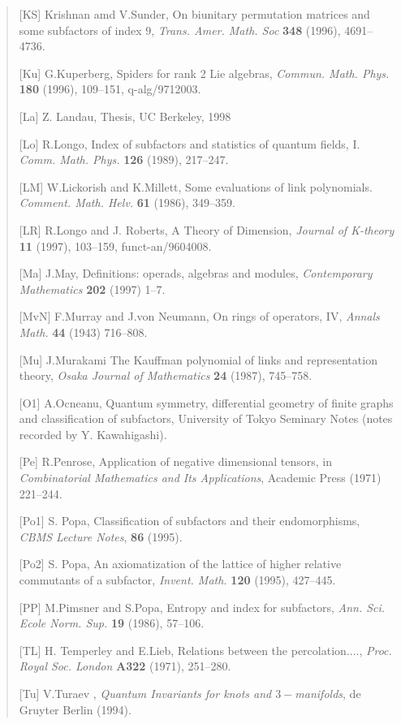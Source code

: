\begin{verse}
[KS] Krishnan amd V.Sunder, On biunitary permutation matrices and some subfactors of index $9$, 
 {\it  Trans. Amer. Math. Soc} {\bf 348} (1996), 4691--4736.

[Ku] G.Kuperberg, Spiders for rank 2 Lie algebras, {\it
Commun. Math. Phys.} {\bf 180} (1996), 109--151, q-alg/9712003.

[La] Z. Landau, Thesis, UC Berkeley, 1998

[Lo] R.Longo, Index of subfactors and statistics of
quantum fields, I.
 {\it Comm. Math. Phys.} {\bf 126} (1989), 217--247.

[LM] W.Lickorish and K.Millett, Some evaluations of link 
polynomials.
{\it Comment. Math. Helv.} {\bf 61} (1986), 349--359.

[LR] R.Longo and J. Roberts, A Theory of Dimension,
{\it Journal of K-theory} {\bf 11} (1997), 103--159, funct-an/9604008.

[Ma] J.May, Definitions: operads, algebras and
modules, {\it Contemporary
              Mathematics } {\bf 202} (1997) 1--7.


[MvN] F.Murray and J.von Neumann, On rings of operators,
IV, {\it Annals Math.} {\bf 44} (1943)
      716--808.

[Mu] J.Murakami The Kauffman polynomial of links and representation theory,
{\it Osaka Journal of Mathematics} {\bf 24} (1987), 745--758.

[O1] A.Ocneanu,
 Quantum symmetry, differential geometry of finite graphs and
classification of subfactors,  University of Tokyo Seminary Notes
(notes recorded by Y. Kawahigashi).


[Pe] R.Penrose, Application of negative dimensional
tensors, in  {\it Combinatorial
    Mathematics and Its Applications}, Academic Press (1971)
221--244.


[Po1] S. Popa, Classification of subfactors and their
endomorphisms,  {\it CBMS Lecture Notes}, {\bf 86} (1995).



[Po2] S. Popa, An axiomatization of the lattice of higher
relative commutants of a subfactor, {\it Invent. Math.} {\bf120}
(1995), 427--445.


[PP] M.Pimsner and S.Popa, Entropy and index for
subfactors,  {\it Ann.
Sci. Ecole Norm. Sup.} {\bf19} (1986), 57--106.

[TL] H. Temperley and E.Lieb, Relations between the percolation....,
{\it Proc. Royal Soc. London} {\bf A322} (1971), 251--280.

[Tu] V.Turaev , {\it Quantum Invariants for knots and $3-$manifolds},
de Gruyter Berlin (1994).



\end{verse}
